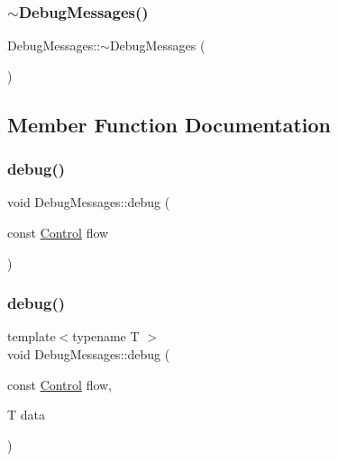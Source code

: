\mbox{\label{class_debug_messages_a3700e476ad70d27ba14be67b43ff6f69}} 
\subsubsection{\texorpdfstring{$\sim$\+Debug\+Messages()}{~DebugMessages()}}
{\footnotesize\ttfamily Debug\+Messages\+::$\sim$\+Debug\+Messages (\begin{DoxyParamCaption}{ }\end{DoxyParamCaption})}



\subsection{Member Function Documentation}
\mbox{\label{class_debug_messages_a5cd8aa8eb917f7da19484adc2c7e31a2}} 
\subsubsection{\texorpdfstring{debug()}{debug()}\hspace{0.1cm}{\footnotesize\ttfamily [1/2]}}
{\footnotesize\ttfamily void Debug\+Messages\+::debug (\begin{DoxyParamCaption}\item[{const \mbox{\hyperlink{_debug_messages_8h_a0da83e35f29c11f7f3c637234f2149f9}{Control}}}]{flow }\end{DoxyParamCaption})}

\mbox{\label{class_debug_messages_a49564f4a501f15317f26c360d0bfdb90}} 
\subsubsection{\texorpdfstring{debug()}{debug()}\hspace{0.1cm}{\footnotesize\ttfamily [2/2]}}
{\footnotesize\ttfamily template$<$typename T $>$ \\
void Debug\+Messages\+::debug (\begin{DoxyParamCaption}\item[{const \mbox{\hyperlink{_debug_messages_8h_a0da83e35f29c11f7f3c637234f2149f9}{Control}}}]{flow,  }\item[{T}]{data }\end{DoxyParamCaption})\hspace{0.3cm}{\ttfamily [inline]}}

